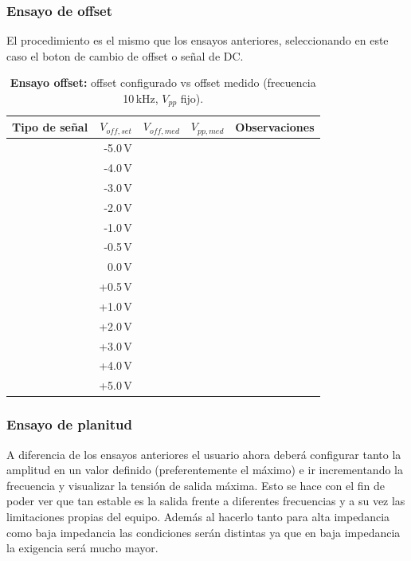 \subsubsection{Ensayo de offset}
El procedimiento es el mismo que los ensayos anteriores, seleccionando en este caso el boton de cambio de offset o señal de DC.

\begin{table}[H]
	\centering
	\label{tab:offset_set_meas}
	\begin{tabular}{|l|r|r|r|l|}
		\hline
		Tipo de se\~nal & $V_{off,set}$ & $V_{off,med}$ & $V_{pp,med}$ & Observaciones \\ \hline
		& -5.0\,V &  &  & \\ \hline
		& -4.0\,V &  &  & \\ \hline
		& -3.0\,V &  &  & \\ \hline
		& -2.0\,V &  &  & \\ \hline
		& -1.0\,V &  &  & \\ \hline
		& -0.5\,V &  &  & \\ \hline
		& 0.0\,V  &  &  & \\ \hline
		& +0.5\,V &  &  & \\ \hline
		& +1.0\,V &  &  & \\ \hline
		& +2.0\,V &  &  & \\ \hline
		& +3.0\,V &  &  & \\ \hline
		& +4.0\,V &  &  & \\ \hline
		& +5.0\,V &  &  & \\ \hline
	\end{tabular}
	\caption{\textbf{Ensayo offset:} offset configurado vs offset medido (frecuencia 10\,kHz, $V_{pp}$ fijo).}
\end{table}

\subsubsection{Ensayo de planitud}
A diferencia de los ensayos anteriores el usuario ahora deberá configurar tanto la amplitud en un valor definido (preferentemente el máximo) e ir incrementando la frecuencia y visualizar la tensión de salida máxima. Esto se hace con el fin de poder ver que tan estable es la salida frente a diferentes frecuencias y a su vez las limitaciones propias del equipo. Además al hacerlo tanto para alta impedancia como baja impedancia las condiciones serán distintas ya que en baja impedancia la exigencia será mucho mayor.

